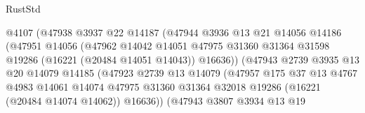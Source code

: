 \begin{lexlean}{RustStd}
\begin{coremodule}
                                  @4107
                                  (@47938
                                    @3937
                                    @22
                                    @14187
                                    (@47944
                                      @3936
                                      @13
                                      @21
                                      @14056
                                      @14186
                                      (@47951
                                        @14056
                                        (@47962
                                          @14042
                                          @14051
                                          @47975
                                          @31360
                                          @31364
                                          @31598
                                          @19286
                                          (@16221 (@20484 @14051 @14043))
                                          @16636))
                                      (@47943
                                        @2739
                                        @3935
                                        @13
                                        @20
                                        @14079
                                        @14185
                                        (@47923
                                          @2739
                                          @13
                                          @14079
                                          (@47957
                                            @175
                                            @37
                                            @13
                                            @4767
                                            @4983
                                            @14061
                                            @14074
                                            @47975
                                            @31360
                                            @31364
                                            @32018
                                            @19286
                                            (@16221 (@20484 @14074 @14062))
                                            @16636))
                                        (@47943
                                          @3807
                                          @3934
                                          @13
                                          @19

\end{coremodule}
\end{lexlean}
